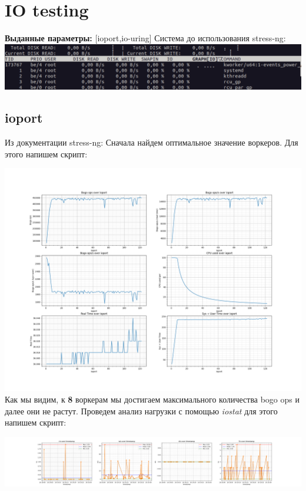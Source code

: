 \section{IO testing}
\textbf{Выданные параметры:} [ioport,io-uring]
Система до использования stress-ng:\\
\includegraphics[width=\textwidth]{./io/image/iotop-before.png}
\subsection{ioport}
Из документации stress-ng:
Сначала найдем оптимальное значение воркеров. Для этого напишем скрипт:

\includegraphics[width=\textwidth]{./io/image/ioport-bogops.png}
Как мы видим, к \textbf{8} воркерам мы достигаем максимального количества bogo ops и далее они не растут.
Проведем анализ нагрузки с помощью \textit{iostat} для этого напишем скрипт:

\includegraphics[width=\textwidth]{./io/image/iostat_1.png}
